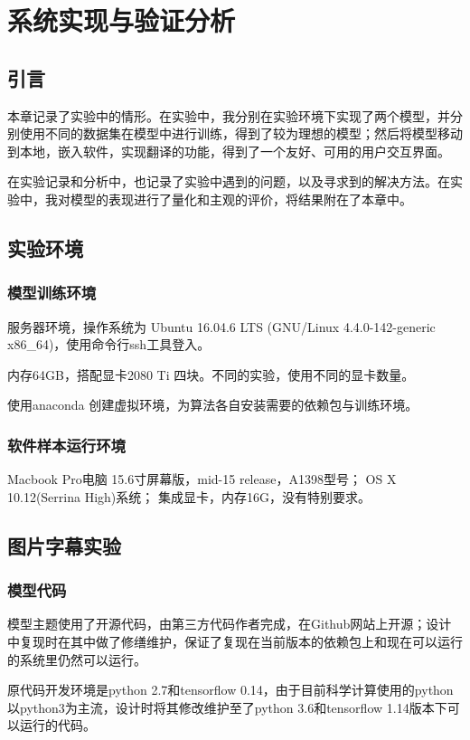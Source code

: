 
\chapter{系统实现与验证分析}

\section{引言}
本章记录了实验中的情形。在实验中，我分别在实验环境下实现了两个模型，并分别使用不同的数据集在模型中进行训练，得到了较为理想的模型；然后将模型移动到本地，嵌入软件，实现翻译的功能，得到了一个友好、可用的用户交互界面。

在实验记录和分析中，也记录了实验中遇到的问题，以及寻求到的解决方法。在实验中，我对模型的表现进行了量化和主观的评价，将结果附在了本章中。

\section{实验环境}
\subsection{模型训练环境}
服务器环境，操作系统为
Ubuntu 16.04.6 LTS (GNU/Linux 4.4.0-142-generic x86\_64)，使用命令行ssh工具登入。

内存64GB，搭配显卡2080 Ti 四块。不同的实验，使用不同的显卡数量。

使用anaconda 创建虚拟环境，为算法各自安装需要的依赖包与训练环境。
\subsection{软件样本运行环境}
Macbook Pro电脑 15.6寸屏幕版，mid-15 release，A1398型号；
OS X 10.12(Serrina High)系统；
集成显卡，内存16G，没有特别要求。

\section{图片字幕实验}
\subsection{模型代码}
模型主题使用了开源代码，由第三方代码作者完成，在Github网站上开源；设计中复现时在其中做了修缮维护，保证了复现在当前版本的依赖包上和现在可以运行的系统里仍然可以运行。

原代码开发环境是python 2.7和tensorflow 0.14，由于目前科学计算使用的python以python3为主流，设计时将其修改维护至了python 3.6和tensorflow 1.14版本下可以运行的代码。

